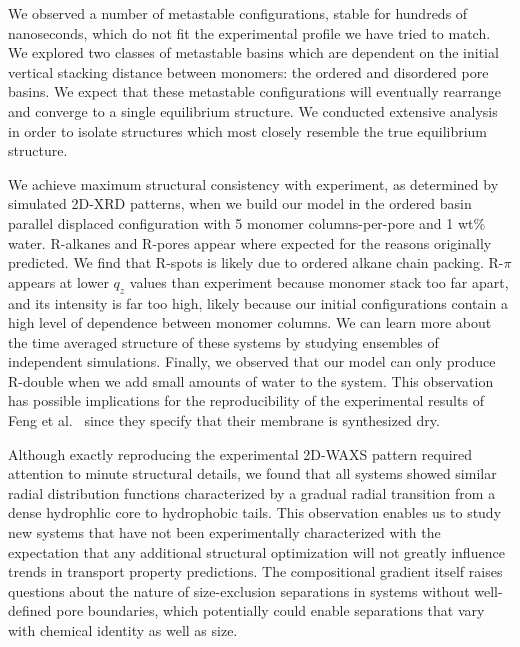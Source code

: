   We observed a number of metastable configurations, stable for hundreds of 
  nanoseconds, which do not fit the experimental profile we have tried to match. 
  We explored two classes of metastable basins which are dependent on the initial
  vertical stacking distance between monomers: the ordered and disordered pore basins.
  We expect that these metastable configurations will eventually rearrange and converge
  to a single equilibrium structure. We conducted extensive analysis in order to 
  isolate structures which most closely resemble the true equilibrium structure.

  We achieve maximum structural consistency with experiment, as determined by
  simulated 2D-XRD patterns, when we build our model in the ordered basin
  parallel displaced configuration with 5 monomer columns-per-pore and 1 wt\%
  water. R-alkanes and R-pores appear where expected for the reasons originally
  predicted. We find that R-spots is likely due to ordered alkane chain packing.
  R-$\pi$ appears at lower $q_z$ values than experiment because monomer stack too far
  apart, and its intensity is far too high, likely because our initial
  configurations contain a high level of dependence between monomer columns.
  We can learn more about the time averaged structure of these systems by studying
  ensembles of independent simulations. Finally, we observed that our model can 
  only produce R-double when we add small amounts of water to the system. This 
  observation has possible implications for the reproducibility of the experimental
  results of Feng et al.~\cite{feng_scalable_2014,feng_thin_2016} since they
  specify that their membrane is synthesized dry.  

  Although exactly reproducing the experimental 2D-WAXS pattern required
  attention to minute structural details, we found that all systems showed
  similar radial distribution functions characterized by a gradual radial
  transition from a dense hydrophlic core to hydrophobic tails. This observation
  enables us to study new systems that have not been experimentally characterized
  with the expectation that any additional structural optimization will not
  greatly influence trends in transport property predictions. The compositional
  gradient itself raises questions about the nature of size-exclusion separations
  in systems without well-defined pore boundaries, which potentially could enable
  separations that vary with chemical identity as well as size. 



